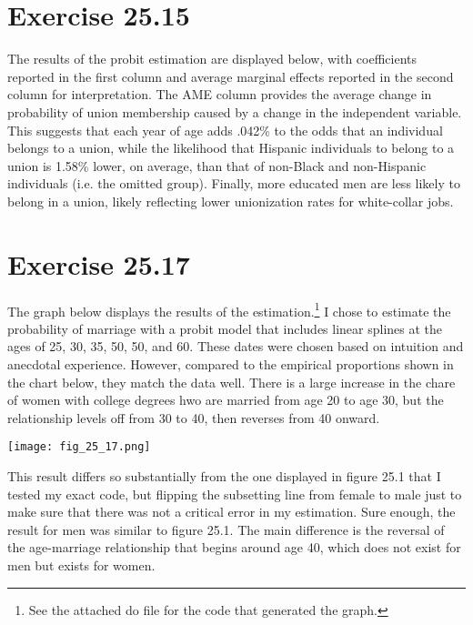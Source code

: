 \documentclass{article}
\begin{document}
\pagebreak
\section*{Exercise 25.15}
The results of the probit estimation are displayed below, with coefficients reported in the first column and average marginal effects reported in the second column for interpretation. The AME column provides the average change in probability of union membership caused by a change in the independent variable. This suggests that each year of age adds .042\% to the odds that an individual belongs to a union, while the likelihood that Hispanic individuals to belong to a union is 1.58\% lower, on average, than that of non-Black and non-Hispanic individuals (i.e. the omitted group). Finally, more educated men are less likely to belong in a union, likely reflecting lower unionization rates for white-collar jobs.

\begin{center}
	
\end{center}

\pagebreak
\section*{Exercise 25.17}
The graph below displays the results of the estimation.\footnote{See the attached do file for the code that generated the graph.} I chose to estimate the probability of marriage with a probit model that includes linear splines at the ages of 25, 30, 35, 50, 50, and 60. These dates were chosen based on intuition and anecdotal experience. However, compared to the empirical proportions shown in the chart below, they match the data well. There is a large increase in the chare of women with college degrees hwo are married from age 20 to age 30, but the relationship levels off from 30 to 40, then reverses from 40 onward.
\begin{center}
	\texttt{[image: fig\_25\_17.png]}
\end{center}
This result differs so substantially from the one displayed in figure 25.1 that I tested my exact code, but flipping the subsetting line from female to male just to make sure that there was not a critical error in my estimation. Sure enough, the result for men was similar to figure 25.1. The main difference is the reversal of the age-marriage relationship that begins around age 40, which does not exist for men but exists for women.
\end{document}
